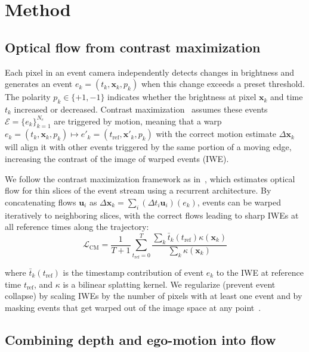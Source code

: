 \section{Method}
\label{sec:cvpr_method}

\subsection*{Optical flow from contrast maximization}

Each pixel in an event camera independently detects changes in brightness and generates an event $e_k = (t_k, \boldsymbol{x}_k, p_k)$ when this change exceeds a preset threshold. The polarity $p_k \in \{+1, -1\}$ indicates whether the brightness at pixel $\boldsymbol{x}_k$ and time $t_k$ increased or decreased. Contrast maximization~\cite{gallego2018unifying,gallego2019focus} assumes these events $\mathcal{E} = \{e_k\}_{k=1}^{N_e}$ are triggered by motion, meaning that a warp $e_k = (t_k, \boldsymbol{x}_k, p_k) \mapsto e'_k = (t_\text{ref}, \boldsymbol{x}'_k, p_k)$ with the correct motion estimate $\Delta\boldsymbol{x}_k$ will align it with other events triggered by the same portion of a moving edge, increasing the contrast of the image of warped events (IWE).

We follow the contrast maximization framework as in~\cite{paredes-valles2023taming}, which estimates optical flow for thin slices of the event stream using a recurrent architecture. By concatenating flows $\boldsymbol{u}_i$ as $\Delta\boldsymbol{x}_k=\sum_i(\Delta t_i \boldsymbol{u}_i)(e_k)$, events can be warped iteratively to neighboring slices, with the correct flows leading to sharp IWEs at all reference times along the trajectory:
\begin{equation}
    \mathcal{L}_\text{CM} = \frac{1}{T + 1} \sum_{t_\text{ref} = 0}^T \frac{\sum_k \bar{t}_k(t_\text{ref}) \kappa(\boldsymbol{x}_k)}{\sum_k \kappa(\boldsymbol{x}_k)}
    \label{eq:cvpr_multiref}
\end{equation}

where $\bar{t}_k(t_\text{ref})$ is the timestamp contribution of event $e_k$ to the IWE at reference time $t_\text{ref}$, and $\kappa$ is a bilinear splatting kernel. We regularize (prevent event collapse) by scaling IWEs by the number of pixels with at least one event and by masking events that get warped out of the image space at any point~\cite{hagenaars2021selfsupervised,paredes-valles2023taming}.

\subsection*{Combining depth and ego-motion into flow}

